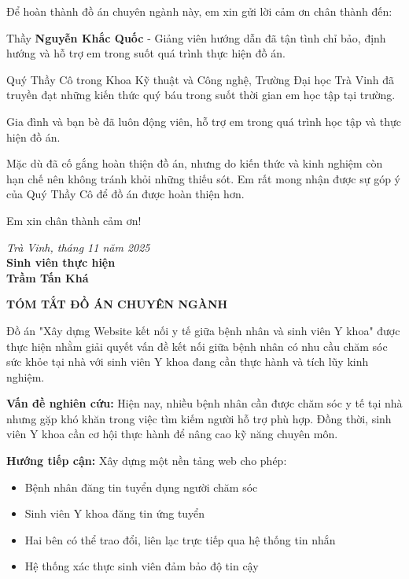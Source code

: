 \documentclass[a4paper,12pt]{report}
\begin{document}
Để hoàn thành đồ án chuyên ngành này, em xin gửi lời cảm ơn chân thành đến:

Thầy \textbf{Nguyễn Khắc Quốc} - Giảng viên hướng dẫn đã tận tình chỉ bảo, định hướng và hỗ trợ em trong suốt quá trình thực hiện đồ án.

Quý Thầy Cô trong Khoa Kỹ thuật và Công nghệ, Trường Đại học Trà Vinh đã truyền đạt những kiến thức quý báu trong suốt thời gian em học tập tại trường.

Gia đình và bạn bè đã luôn động viên, hỗ trợ em trong quá trình học tập và thực hiện đồ án.

Mặc dù đã cố gắng hoàn thiện đồ án, nhưng do kiến thức và kinh nghiệm còn hạn chế nên không tránh khỏi những thiếu sót. Em rất mong nhận được sự góp ý của Quý Thầy Cô để đồ án được hoàn thiện hơn.

Em xin chân thành cảm ơn!

\begin{flushright}
\textit{Trà Vinh, tháng 11 năm 2025}\\
\textbf{Sinh viên thực hiện}\\[1cm]
\textbf{Trầm Tấn Khá}
\end{flushright}

\newpage
\tableofcontents

\newpage
\listoffigures
{}

\newpage
\listoftables
{}


\newpage
{}
\begin{center}
\textbf{\Large TÓM TẮT ĐỒ ÁN CHUYÊN NGÀNH}
\end{center}
\vspace{1cm}

Đồ án "Xây dựng Website kết nối y tế giữa bệnh nhân và sinh viên Y khoa" được thực hiện nhằm giải quyết vấn đề kết nối giữa bệnh nhân có nhu cầu chăm sóc sức khỏe tại nhà với sinh viên Y khoa đang cần thực hành và tích lũy kinh nghiệm.

\textbf{Vấn đề nghiên cứu:} Hiện nay, nhiều bệnh nhân cần được chăm sóc y tế tại nhà nhưng gặp khó khăn trong việc tìm kiếm người hỗ trợ phù hợp. Đồng thời, sinh viên Y khoa cần cơ hội thực hành để nâng cao kỹ năng chuyên môn.

\textbf{Hướng tiếp cận:} Xây dựng một nền tảng web cho phép:
\begin{itemize}
    \item Bệnh nhân đăng tin tuyển dụng người chăm sóc
    \item Sinh viên Y khoa đăng tin ứng tuyển
    \item Hai bên có thể trao đổi, liên lạc trực tiếp qua hệ thống tin nhắn
    \item Hệ thống xác thực sinh viên đảm bảo độ tin cậy
\end{itemize}
\end{document}
